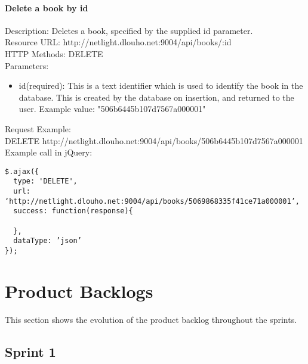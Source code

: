 \subsubsection{Delete a book by id}
Description: Deletes a book, specified by the supplied id parameter.	\\
\newline
Resource URL: http://netlight.dlouho.net:9004/api/books/:id 	\\
HTTP Methods: DELETE		\\
Parameters: 			
\begin{itemize}

\item id(required): This is a text identifier which is used to identify the book in the database. This is created by the database on insertion, and returned to the user. Example value: "506b6445b107d7567a000001"

\end{itemize}
Request Example:		\\
DELETE	http://netlight.dlouho.net:9004/api/books/506b6445b107d7567a000001	\\
\newline
Example call in jQuery:
\begin{verbatim}
$.ajax({
  type: 'DELETE',
  url: ‘http://netlight.dlouho.net:9004/api/books/5069868335f41ce71a000001’, 
  success: function(response){
  
  },
  dataType: ’json’
});
\end{verbatim}

\clearpage

\chapter{Product Backlogs}

This section shows the evolution of the product backlog throughout the sprints.

\section{Sprint 1}
\label{sprint1pb}

